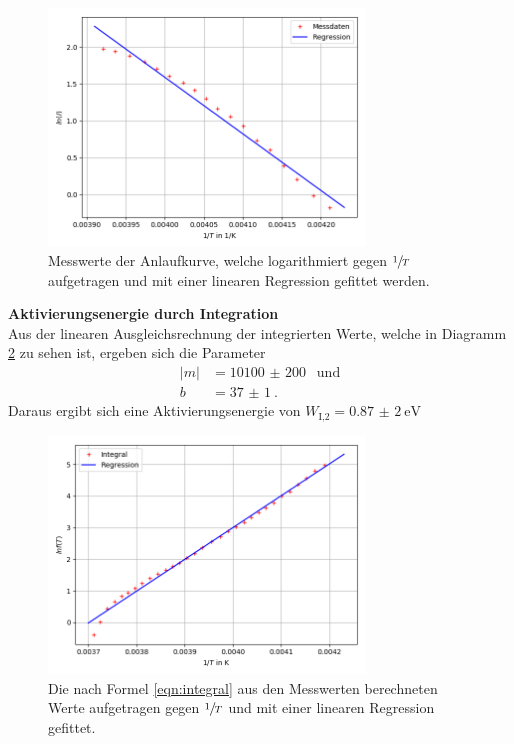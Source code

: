 \begin{figure}[H]
  \centering
  \includegraphics[width=0.75\textwidth]{Dipol2Anlauf.png}
  \caption{Messwerte der Anlaufkurve, welche logarithmiert gegen $\sfrac{1}{T}$ aufgetragen und mit
  einer linearen Regression gefittet werden.}
  \label{fig:Abb3}
\end{figure}

\textbf{Aktivierungsenergie durch Integration}\\
Aus der linearen Ausgleichsrechnung der integrierten Werte, welche in Diagramm \ref{fig:Abb4}
zu sehen ist, ergeben sich die Parameter
\begin{align}
  |m|&=\SI{10100(200)}{}\;\; \text{und}\\
  b&=\SI{37(1)}{}.
\end{align}
Daraus ergibt sich eine Aktivierungsenergie von $W_\text{I,2}=\SI{0,87(2)}{\eV}$

\begin{figure}[H]
  \centering
  \includegraphics[width=0.75\textwidth]{Dipol2Integral.png}
  \caption{Die nach Formel \ref{eqn:integral} aus den Messwerten berechneten Werte aufgetragen
  gegen $\sfrac{1}{T}$ und mit einer linearen Regression gefittet.}
  \label{fig:Abb4}
\end{figure}

